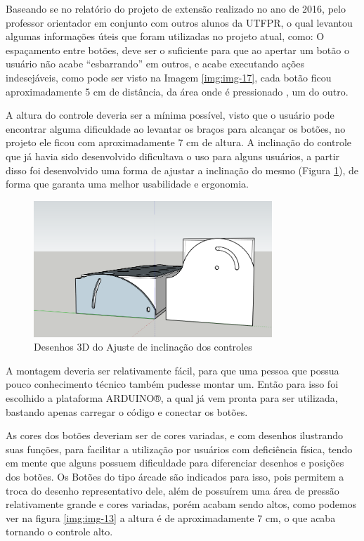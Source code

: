 \documentclass[
	12pt,			%
	openright,		%
	oneside,			%
	a4paper,			%
	chapter=TITLE,		%
	english,			%
	brazil,			%
	]{abntex2}
\begin{document}
Baseando se no relatório do projeto de extensão realizado no ano de 2016, pelo professor orientador em conjunto com outros alunos da UTFPR, o qual levantou algumas informações úteis que foram utilizadas no projeto atual, como:
O espaçamento entre botões, deve ser o suficiente para que ao apertar um botão o usuário não acabe “esbarrando” em outros, e acabe executando ações indesejáveis, como pode ser visto na Imagem \ref{img:img-17}, cada botão ficou aproximadamente 5 cm de distância, da área onde é pressionado , um do outro.

A altura do controle deveria ser a mínima possível, visto que o usuário pode encontrar alguma dificuldade ao levantar os braços para alcançar os botões, no projeto ele ficou com aproximadamente 7 cm de altura.
A inclinação do controle que já havia sido desenvolvido dificultava o uso para alguns usuários, a partir disso foi desenvolvido uma forma de ajustar a inclinação do mesmo (Figura \ref{img:img-18}), de forma que garanta uma melhor usabilidade e ergonomia.

\begin{figure}[H]
	\centering
		\includegraphics[width=0.8\textwidth]{./img/img-18.png}
		\caption{Desenhos 3D do Ajuste de inclinação dos controles}
		\label{img:img-18}
\end{figure}

A montagem deveria ser relativamente fácil, para que uma pessoa que possua pouco conhecimento técnico também pudesse montar um. Então para isso foi escolhido a plataforma ARDUINO®, a qual já vem pronta para ser utilizada, bastando apenas carregar o código e conectar os botões.

As cores dos botões deveriam ser de cores variadas, e com desenhos ilustrando suas funções, para facilitar a utilização por usuários com deficiência física, tendo em mente que alguns possuem dificuldade para diferenciar desenhos e posições dos botões. Os Botões do tipo árcade são indicados para isso, pois permitem a troca do desenho representativo dele, além de possuírem uma área de pressão relativamente grande e cores variadas, porém acabam sendo altos, como podemos ver na figura \ref{img:img-13} a altura é de aproximadamente 7 cm, o que acaba tornando o controle alto.
\end{document}
